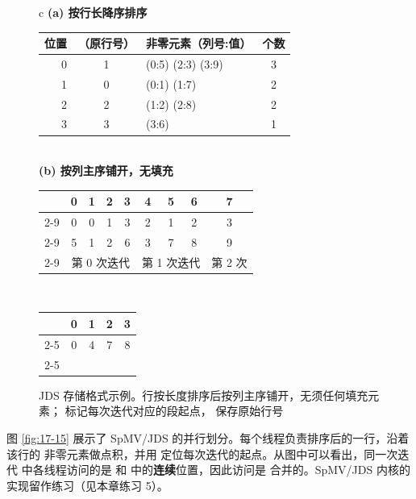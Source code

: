 \begin{figure}[htbp]
  \centering
  \small
  \begin{tabular}{c}
  \textbf{(a) 按行长降序排序}\\[0.5em]
  \setlength{\tabcolsep}{5pt}
  \begin{tabular}{r|c|l|c}
    \hline
    位置 & \code{row}（原行号） & 非零元素（列号:值） & 个数\\
    \hline
    0 & 1 & (0:5) (2:3) (3:9) & 3\\
    1 & 0 & (0:1) (1:7) & 2\\
    2 & 2 & (1:2) (2:8) & 2\\
    3 & 3 & (3:6) & 1\\
    \hline
  \end{tabular}
  \\[1.2em]
  \textbf{(b) 按列主序铺开，无填充}\\[0.5em]
  \setlength{\tabcolsep}{4pt}
  \begin{tabular}{r|c|c|c|c|c|c|c|c|}
    \multicolumn{1}{c}{} & \multicolumn{1}{c}{0} & \multicolumn{1}{c}{1}
      & \multicolumn{1}{c}{2} & \multicolumn{1}{c}{3} & \multicolumn{1}{c}{4}
      & \multicolumn{1}{c}{5} & \multicolumn{1}{c}{6} & \multicolumn{1}{c}{7}\\
    \cline{2-9}
    \code{colIdx} & 0 & 0 & 1 & 3 & 2 & 1 & 2 & 3\\
    \cline{2-9}
    \code{value}  & 5 & 1 & 2 & 6 & 3 & 7 & 8 & 9\\
    \cline{2-9}
    \multicolumn{1}{c}{} & \multicolumn{4}{c}{\footnotesize 第 0 次迭代}
      & \multicolumn{3}{c}{\footnotesize 第 1 次迭代} & \multicolumn{1}{c}{\footnotesize 第 2 次}
  \end{tabular}
  \\[0.7em]
  \setlength{\tabcolsep}{4pt}
  \begin{tabular}{r|c|c|c|c|}
    \multicolumn{1}{c}{} & \multicolumn{1}{c}{0} & \multicolumn{1}{c}{1}
      & \multicolumn{1}{c}{2} & \multicolumn{1}{c}{3}\\
    \cline{2-5}
    \code{iterPtr} & 0 & 4 & 7 & 8\\
    \cline{2-5}
  \end{tabular}
  \end{tabular}
  \caption{JDS 存储格式示例。行按长度排序后按列主序铺开，无须任何填充元素；
   标记每次迭代对应的段起点， 保存原始行号}
  \label{fig:17-14}
\end{figure}

图 \ref{fig:17-15} 展示了 SpMV/JDS 的并行划分。每个线程负责排序后的一行，沿着该行的
非零元素做点积，并用  定位每次迭代的起点。从图中可以看出，同一次迭代
中各线程访问的是  和  中的\textbf{连续}位置，因此访问是
合并的。SpMV/JDS 内核的实现留作练习（见本章练习 5）。

